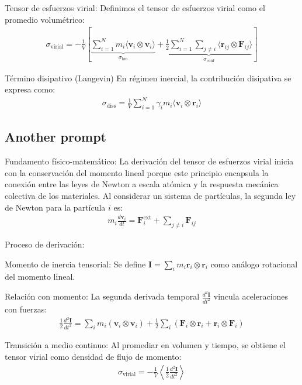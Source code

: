 \documentclass[../../main-notes.tex]{subfiles}
\begin{document}
Tensor de esfuerzos virial:
Definimos el tensor de esfuerzos virial como el promedio volumétrico:
\begin{gather*}
\boxed{\sigma_{\text{virial}} = -\frac{1}{V} \left[ \underbrace{\sum_{i=1}^N m_i \langle \mathbf{v}_i \otimes \mathbf{v}_i \rangle}_{\sigma_{\text{kin}}} + \underbrace{\frac{1}{2}\sum_{i=1}^N \sum_{j\neq i} \langle \mathbf{r}_{ij} \otimes \mathbf{F}_{ij} \rangle}_{\sigma_{\text{conf}}} \right]}
\end{gather*}

Término disipativo (Langevin)
En régimen inercial, la contribución disipativa se expresa como:
\begin{gather*}
\sigma_{\text{diss}} = \frac{1}{V} \sum_{i=1}^N \gamma_i m_i \langle \mathbf{v}_i \otimes \mathbf{r}_i \rangle
\end{gather*}


\subsection{Another prompt}

Fundamento físico-matemático:
La derivación del tensor de esfuerzos virial inicia con la conservación del momento lineal porque este principio encapsula la conexión entre las leyes de Newton a escala atómica y la respuesta mecánica colectiva de los materiales. Al considerar un sistema de partículas, la segunda ley de Newton para la partícula $i$ es:
\begin{gather*}
m_i \frac{d\mathbf{v}_i}{dt} = \mathbf{F}_i^{\text{ext}} + \sum_{j \neq i} \mathbf{F}_{ij}
\end{gather*}

Proceso de derivación:

Momento de inercia tensorial: Se define $\mathbf{I} = \sum_i m_i \mathbf{r}_i \otimes \mathbf{r}_i$ como análogo rotacional del momento lineal.

Relación con momento: La segunda derivada temporal $\frac{d^2\mathbf{I}}{dt^2}$ vincula aceleraciones con fuerzas:
\begin{gather*}
\frac{1}{2}\frac{d^2\mathbf{I}}{dt^2} = \sum_i m_i (\mathbf{v}_i \otimes \mathbf{v}_i) + \frac{1}{2}\sum_i (\mathbf{F}_i \otimes \mathbf{r}_i + \mathbf{r}_i \otimes \mathbf{F}_i)
\end{gather*}

Transición a medio continuo: Al promediar en volumen y tiempo, se obtiene el tensor virial como densidad de flujo de momento:
\begin{gather*}
\sigma_{\text{virial}} = -\frac{1}{V} \left\langle \frac{1}{2}\frac{d^2\mathbf{I}}{dt^2} \right\rangle
\end{gather*}
\end{document}
